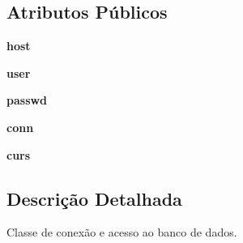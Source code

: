 \subsection*{\-Atributos \-Públicos}
\begin{DoxyCompactItemize}
\item 
\hypertarget{classmodel__mysql_1_1Connect__MySQL_aa91deb020a327e7ba45a7cb778b6e725}{{\bfseries host}}\label{classmodel__mysql_1_1Connect__MySQL_aa91deb020a327e7ba45a7cb778b6e725}

\item 
\hypertarget{classmodel__mysql_1_1Connect__MySQL_abc2ce65eebb53d3372d6dde5ca842ed8}{{\bfseries user}}\label{classmodel__mysql_1_1Connect__MySQL_abc2ce65eebb53d3372d6dde5ca842ed8}

\item 
\hypertarget{classmodel__mysql_1_1Connect__MySQL_a185f31aadd492d5285a2a849aeff7809}{{\bfseries passwd}}\label{classmodel__mysql_1_1Connect__MySQL_a185f31aadd492d5285a2a849aeff7809}

\item 
\hypertarget{classmodel__mysql_1_1Connect__MySQL_a13bd27860c6b3db1cb74ee5ca38f2d59}{{\bfseries conn}}\label{classmodel__mysql_1_1Connect__MySQL_a13bd27860c6b3db1cb74ee5ca38f2d59}

\item 
\hypertarget{classmodel__mysql_1_1Connect__MySQL_ac4b459317868ae3c2524adf97de2215f}{{\bfseries curs}}\label{classmodel__mysql_1_1Connect__MySQL_ac4b459317868ae3c2524adf97de2215f}

\end{DoxyCompactItemize}


\subsection{\-Descrição \-Detalhada}
\-Classe de conexão e acesso ao banco de dados. 

